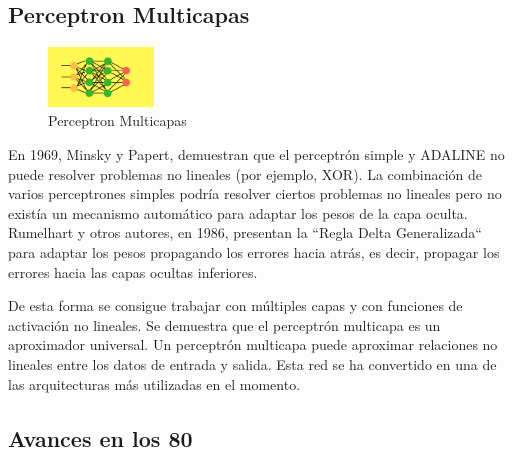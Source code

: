 \documentclass[a4paper]{article}
\begin{document}
\subsection{Perceptron Multicapas}
\begin{figure} %
    \centering
    \includegraphics[width=0.25\textwidth]{./images/net_multilayer.png}
    \caption{Perceptron Multicapas}
\end{figure}
En 1969, Minsky y Papert, demuestran que el perceptrón simple y 
ADALINE no puede resolver problemas no lineales (por ejemplo, 
XOR). La combinación de varios perceptrones simples podría 
resolver ciertos problemas no lineales pero no existía un 
mecanismo automático para adaptar los pesos de la capa oculta. 
Rumelhart y otros autores, en 1986, presentan la ``Regla Delta 
Generalizada`` para adaptar los pesos propagando los errores hacia 
atrás, es decir, propagar los errores hacia las capas ocultas 
inferiores.


 De esta forma se consigue trabajar con múltiples capas y con 
 funciones de activación no lineales. Se demuestra que el 
 perceptrón multicapa es un aproximador universal. Un perceptrón 
 multicapa puede aproximar relaciones no lineales entre los datos 
 de entrada y salida. Esta red se ha convertido en una de las 
 arquitecturas más utilizadas en el momento.

\subsection{Avances en los 80}
\end{document}
